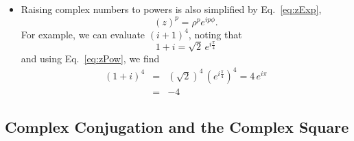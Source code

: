 \documentclass[12pt]{article}
\begin{document}
\begin{itemize}
\item Raising complex numbers to powers is also simplified by
  Eq.~\ref{eq:zExp}, 
  \begin{equation}
    \label{eq:zPow}
    (z)^p = \rho^p e^{i p \phi}.
  \end{equation}
  For example, we can evaluate $(i+1)^4$, noting that 
  \[
  1+i = \sqrt{2} \, e^{i\frac{\pi}{4}}
  \]
  and using Eq.~\ref{eq:zPow}, we find
  \begin{eqnarray}
    \nonumber
    (1+i)^4 &=& (\sqrt{2})^4 \, (e^{i\frac{\pi}{4}})^4 
    = 4 \, e^{i\pi} \\
    &=& -4
  \end{eqnarray}

\end{itemize}

\subsection*{Complex Conjugation and the Complex Square}
\end{document}
